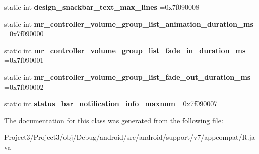 \begin{DoxyCompactItemize}
static int {\bfseries design\+\_\+snackbar\+\_\+text\+\_\+max\+\_\+lines} =0x7f090008
\item 
\mbox{\label{classandroid_1_1support_1_1v7_1_1appcompat_1_1R_1_1integer_a5f59ed9c2ab5a477cdadf5d21a5c816b}} 
static int {\bfseries mr\+\_\+controller\+\_\+volume\+\_\+group\+\_\+list\+\_\+animation\+\_\+duration\+\_\+ms} =0x7f090000
\item 
\mbox{\label{classandroid_1_1support_1_1v7_1_1appcompat_1_1R_1_1integer_a4f7b903596bfffa521a22914775a9a79}} 
static int {\bfseries mr\+\_\+controller\+\_\+volume\+\_\+group\+\_\+list\+\_\+fade\+\_\+in\+\_\+duration\+\_\+ms} =0x7f090001
\item 
\mbox{\label{classandroid_1_1support_1_1v7_1_1appcompat_1_1R_1_1integer_a5e7ed26ad45455625c386d5d45a1a2b2}} 
static int {\bfseries mr\+\_\+controller\+\_\+volume\+\_\+group\+\_\+list\+\_\+fade\+\_\+out\+\_\+duration\+\_\+ms} =0x7f090002
\item 
\mbox{\label{classandroid_1_1support_1_1v7_1_1appcompat_1_1R_1_1integer_a3e7045a2314a3c7da9e7d65dd86aba86}} 
static int {\bfseries status\+\_\+bar\+\_\+notification\+\_\+info\+\_\+maxnum} =0x7f090007
\end{DoxyCompactItemize}


The documentation for this class was generated from the following file\+:\begin{DoxyCompactItemize}
\item 
Project3/\+Project3/obj/\+Debug/android/src/android/support/v7/appcompat/R.\+java\end{DoxyCompactItemize}
